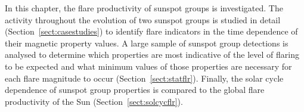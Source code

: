 In this chapter, the flare productivity of sunspot groups is investigated. The activity throughout the evolution of two sunspot groups is studied in detail (Section~\ref{sect:casestudies}) to identify flare indicators in the time dependence of their magnetic property values. A large sample of sunspot group detections is analysed to determine which properties are most indicative of the level of flaring to be expected and what minimum values of those properties are necessary for each flare magnitude to occur (Section~\ref{sect:statflr}). Finally, the solar cycle dependence of sunspot group properties is compared to the global flare productivity of the Sun (Section~\ref{sect:solcycflr}).
                                                                                                                                                                                                                                                                                                                                                                                                                                                                                                                                                                                                                                                                                                                                                                                                                                                                                                                                                                                                                                                                                                                                                                                                                                                                                                                                                                                                                                                                                                                                                                                                                                                                                                                                                                                                                                                                                                                                                                                                                                                                                                                                                                                                                                                                                                                                                                                                                                                                                                                                                                                                                                                                                                                                                  